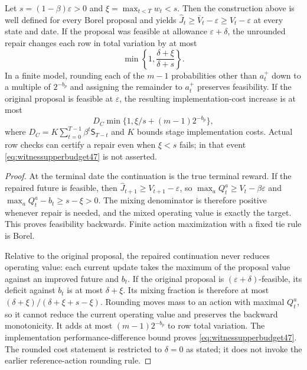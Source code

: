 \begin{theorem}\label{thm:witnessrepair47}
Let $s=(1-\beta)\varepsilon>0$ and $\xi=\max_{t<T}w_t<s$. Then the construction above is well defined for every Borel proposal and yields $\widehat J_t\ge\overline V_t-\varepsilon\ge V_t-\varepsilon$ at every state and date. If the proposal was feasible at allowance $\varepsilon+\delta$, the unrounded repair changes each row in total variation by at most
\begin{equation}\label{eq:witnessrho47}
 \min\left\{1,\frac{\delta+\xi}{\delta+s}\right\}.
\end{equation}
In a finite model, rounding each of the $m-1$ probabilities other than $a_t^+$ down to a multiple of $2^{-b_p}$ and assigning the remainder to $a_t^+$ preserves feasibility. If the original proposal is feasible at $\varepsilon$, the resulting implementation-cost increase is at most
\begin{equation}\label{eq:witnessupperbudget47}
 D_C\min\{1,\xi/s+(m-1)2^{-b_p}\},
\end{equation}
where $D_C=K\sum_{t=0}^{T-1}\beta^t\mathsf S_{T-t}$ and $K$ bounds stage implementation costs. Actual row checks can certify a repair even when $\xi<s$ fails; in that event \eqref{eq:witnessupperbudget47} is not asserted.
\end{theorem}
\begin{proof}
At the terminal date the continuation is the true terminal reward. If the repaired future is feasible, then $\widehat J_{t+1}\ge V_{t+1}-\varepsilon$, so
$\max_a Q_t^a\ge V_t-\beta\varepsilon$ and
$\max_aQ_t^a-b_t\ge s-\xi>0$. The mixing denominator is therefore positive whenever repair is needed, and the mixed operating value is exactly the target. This proves feasibility backwards. Finite action maximization with a fixed tie rule is Borel.

Relative to the original proposal, the repaired continuation never reduces operating value: each current update takes the maximum of the proposal value against an improved future and $b_t$. If the original proposal is $(\varepsilon+\delta)$-feasible, its deficit against $b_t$ is at most $\delta+\xi$. Its mixing fraction is therefore at most $(\delta+\xi)/(\delta+\xi+s-\xi)$. Rounding moves mass to an action with maximal $Q_t^a$, so it cannot reduce the current operating value and preserves the backward monotonicity. It adds at most $(m-1)2^{-b_p}$ to row total variation. The implementation performance-difference bound proves \eqref{eq:witnessupperbudget47}. The rounded cost statement is restricted to $\delta=0$ as stated; it does not invoke the earlier reference-action rounding rule.
\end{proof}

